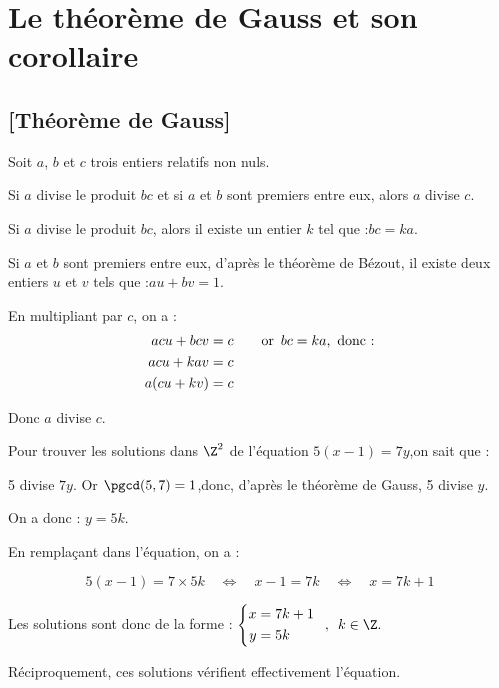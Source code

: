 \section{Le théorème de Gauss et son corollaire}

\subsection{[Théorème de Gauss]{}}

\begin{theoreme}
Soit $a$, $b$ et $c$ trois entiers relatifs non nuls.

Si $a$ divise le produit $bc$ et si $a$ et $b$ sont premiers entre eux, alors $a$ divise $c$.
\end{theoreme}

\begin{preuve}
Si $a$ divise le produit $bc$, alors il existe un entier $k$ tel que :\enskip $bc=ka$.\medskip

Si $a$ et $b$ sont premiers entre eux, d'après le théorème de Bézout, il existe deux entiers $u$ et $v$ tels que :\enskip $au+bv=1$.\medskip

En multipliant par $c$, on a :\vspace{-10pt}
$$\begin{aligned}
acu+bcv&=c \qquad \text{or\enskip $bc=ka$,\enskip donc :}\\
acu+kav&=c\\
a(cu+kv)&=c
\end{aligned}\vspace{-5pt}$$

Donc $a$ divise $c$.
\end{preuve}

\begin{exemple*1}
Pour trouver les solutions dans $\Z^2$ de l'équation \enskip $5(x-1)=7y$,\enskip on sait que :\medskip

5 divise $7y$. Or $\pgcd(5,7)=1$,\enskip donc, d'après le théorème de
Gauss, 5 divise $y$.

On a donc : \enskip $y=5k$.\medskip

En remplaçant dans l'équation, on a : \vspace{-10pt}

$$5(x-1)=7\times5k\quad\Leftrightarrow\quad x-1=7k \quad\Leftrightarrow\quad x=7k+1$$

Les solutions sont donc de la forme : \enskip $\left\{\begin{aligned}
x&=7k+1\\
y&=5k\end{aligned}\right.\enskip,\enskip k\in\Z.$\medskip

Réciproquement, ces solutions vérifient effectivement l’équation.
\end{exemple*1}

